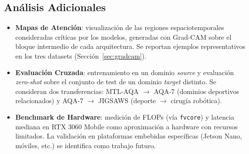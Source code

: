 \subsection{Análisis Adicionales}
\begin{itemize}
    \item \textbf{Mapas de Atención}: visualización de las regiones espaciotemporales consideradas críticas por los modelos, generadas con Grad-CAM sobre el bloque intermedio de cada arquitectura. Se reportan ejemplos representativos en los tres datasets (Sección~\ref{sec:gradcam}).

    \item \textbf{Evaluación Cruzada}: entrenamiento en un dominio \textit{source} y evaluación \textit{zero-shot} sobre el conjunto de test de un dominio \textit{target} distinto. Se consideran dos transferencias: MTL-AQA $\to$ AQA-7 (dominios deportivos relacionados) y AQA-7 $\to$ JIGSAWS (deporte $\to$ cirugía robótica).

    \item \textbf{Benchmark de Hardware}: medición de FLOPs (vía \texttt{fvcore}) y latencia mediana en RTX 3060 Mobile como aproximación a hardware con recursos limitados. La validación en plataformas embebidas específicas (Jetson Nano, móviles, etc.) se identifica como trabajo futuro.
\end{itemize}